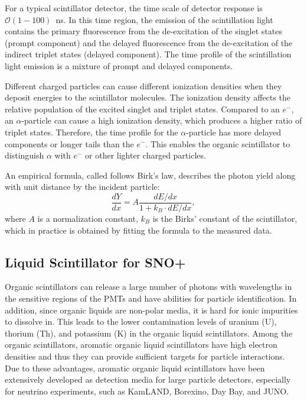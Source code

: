 For a typical scintillator detector, the time scale of detector response is $\mathcal{O}(1-100)$~ns. In this time region, the emission of the scintillation light contains the primary fluorescence from the de-excitation of the singlet states (prompt component) and the delayed fluorescence from the de-excitation of the indirect triplet states (delayed component)\cite{dunger2018topological}. The time profile of the scintillation light emission is a mixture of prompt and delayed components. 

Different charged particles can cause different ionization densities when they deposit energies to the scintillator molecules. The ionization density affects the relative population of the excited singlet and triplet states. Compared to an $e^-$, an $\alpha$-particle can cause a high ionization density, which produces a higher ratio of triplet states. Therefore, the time profile for the $\alpha$-particle has more delayed components or longer tails than the $e^-$. This enables the organic scintillator to distinguish $\alpha$ with $e^-$ or other lighter charged particles\cite{dunger2018topological, collaboration2020development}. 

An empirical formula, called follows Birk's law\cite{birks1951scintillations, birks1965theory}, describes the photon yield along with unit distance by the incident particle:
\begin{equation}
\frac{dY}{dx}=A\frac{dE/dx}{1+k_B\cdot dE/dx},
\end{equation}
where $A$ is a normalization constant, $k_B$ is the Birks' constant of the scintillator, which in practice is obtained by fitting the formula to the measured data.

\subsection{Liquid Scintillator for SNO+}\label{sect:LSproperty}
Organic scintillators can release a large number of photons with wavelengths in the sensitive regions of the PMTs and have abilities for particle identification. In addition, since organic liquids are non-polar media, it is hard for ionic impurities to dissolve in. This leads to the lower contamination levels of uranium (U), thorium (Th), and potassium (K) in the organic liquid scintillators. Among the organic scintillators, aromatic organic liquid scintillators have high electron densities and thus they can provide sufficient targets for particle interactions\cite{PerkinElmer}. Due to these advantages, aromatic organic liquid scintillators have been extensively developed as detection media for large particle detectors, especially for neutrino experiments, such as KamLAND, Borexino, Day Bay, and JUNO\cite{collaboration2020development}.

